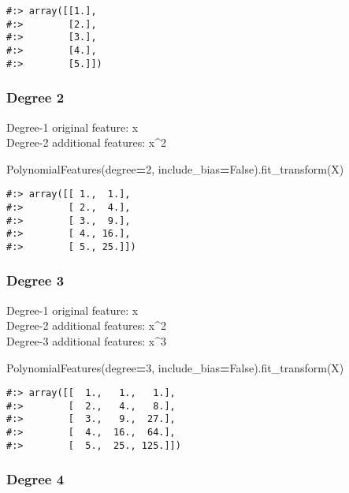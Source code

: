 \documentclass[
]{book}
\newenvironment{Shaded}{\begin{snugshade}}{\end{snugshade}}
\newcommand{\DecValTok}[1]{\textcolor[rgb]{0.06,0.06,0.06}{#1}}
\newcommand{\NormalTok}[1]{#1}
\newcommand{\OperatorTok}[1]{\textcolor[rgb]{0.43,0.43,0.43}{\textbf{#1}}}
\newcommand{\VariableTok}[1]{\textcolor[rgb]{0,0,0}{#1}}
\begin{document}
\begin{verbatim}
#:> array([[1.],
#:>        [2.],
#:>        [3.],
#:>        [4.],
#:>        [5.]])
\end{verbatim}

\hypertarget{degree-2}{%
\subsubsection{Degree 2}\label{degree-2}}

Degree-1 original feature: x\\
Degree-2 additional features: x\^{}2

\begin{Shaded}
\begin{Highlighting}[]
\NormalTok{PolynomialFeatures(degree}\OperatorTok{=}\DecValTok{2}\NormalTok{, include\_bias}\OperatorTok{=}\VariableTok{False}\NormalTok{).fit\_transform(X)}
\end{Highlighting}
\end{Shaded}

\begin{verbatim}
#:> array([[ 1.,  1.],
#:>        [ 2.,  4.],
#:>        [ 3.,  9.],
#:>        [ 4., 16.],
#:>        [ 5., 25.]])
\end{verbatim}

\hypertarget{degree-3}{%
\subsubsection{Degree 3}\label{degree-3}}

Degree-1 original feature: x\\
Degree-2 additional features: x\^{}2\\
Degree-3 additional features: x\^{}3

\begin{Shaded}
\begin{Highlighting}[]
\NormalTok{PolynomialFeatures(degree}\OperatorTok{=}\DecValTok{3}\NormalTok{, include\_bias}\OperatorTok{=}\VariableTok{False}\NormalTok{).fit\_transform(X)}
\end{Highlighting}
\end{Shaded}

\begin{verbatim}
#:> array([[  1.,   1.,   1.],
#:>        [  2.,   4.,   8.],
#:>        [  3.,   9.,  27.],
#:>        [  4.,  16.,  64.],
#:>        [  5.,  25., 125.]])
\end{verbatim}

\hypertarget{degree-4}{%
\subsubsection{Degree 4}\label{degree-4}}
\end{document}
